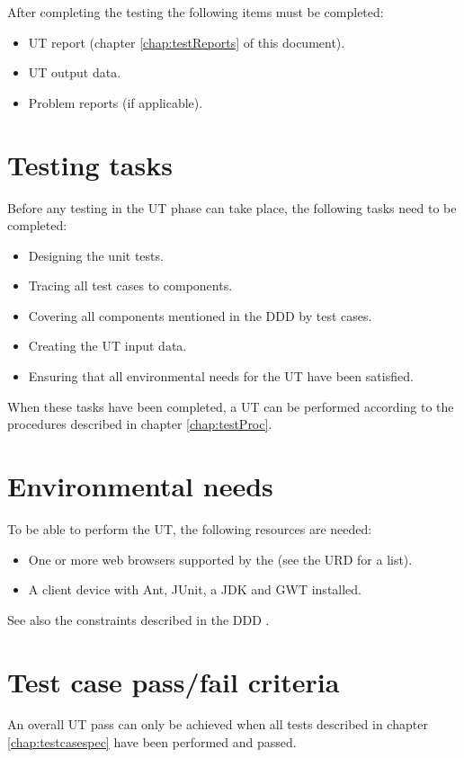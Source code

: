 After completing the testing the following items must be completed:

\begin{itemize}
  \item UT report (chapter \ref{chap:testReports} of this document).
  \item UT output data.
  \item Problem reports (if applicable).
\end{itemize}

\section{Testing tasks}
Before any testing in the UT phase can take place, the following tasks need to be completed:

\begin{itemize}
  \item Designing the unit tests.
  \item Tracing all test cases to components.
  \item Covering all components mentioned in the DDD \cite{DDD} by test cases.
  \item Creating the UT input data.
  \item Ensuring that all environmental needs for the UT have been satisfied.
\end{itemize}

\noindent When these tasks have been completed, a UT can be performed according to the procedures described in chapter \ref{chap:testProc}.

\section{Environmental needs}
To be able to perform the UT, the following resources are needed:

\begin{itemize}
  \item One or more web browsers supported by the \applicationname{} (see the URD \cite{urd} for a list).
  \item A client device with Ant, JUnit, a JDK and GWT installed.
\end{itemize}

\noindent See also the constraints described in the DDD \cite{DDD}.

\section{Test case pass/fail criteria}
An overall UT pass can only be achieved when all tests described in chapter \ref{chap:testcasespec} have been performed and passed.
